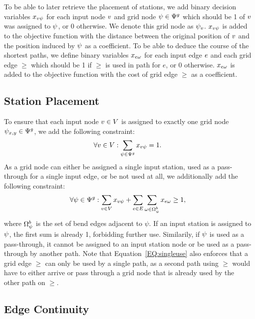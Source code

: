 \documentclass{sig-alternate-sigmod09}
\begin{document}
To be able to later retrieve the placement of stations, we add binary decision variables $x_{v\psi}$ for each input node $v$ and grid node $\psi \in \Psi^g$ which should be 1 of $v$ was assigned to $\psi$, or 0 otherwise.
We denote this grid node as $\psi_v$.
$x_{v\psi}$ is added to the objective function with the distance between the original position of $v$ and the position induced by $\psi$ as a coefficient.
To be able to deduce the course of the shortest paths, we define binary variables $x_{e\omega}$ for each input edge $e$ and each grid edge $\ge$ which should be 1 if $\ge$ is used in path for $e$, or 0 otherwise.
$x_{e\omega}$ is added to the objective function with the cost of grid edge $\ge$ as a coefficient.

\subsection{Station Placement}

To ensure that each input node $v \in V$ is assigned to exactly one grid node $\psi_{x, y} \in \Psi^g$, we add the following constraint:
%
\begin{equation}
  \forall v \in V: \sum_{\psi \in \Psi^g} x_{v\psi} = 1. \label{EQ:onegvperiv}
\end{equation}
%
As a grid node can either be assigned a single input station, used as a pass-through for a single input edge, or be not used at all, we additionally add the following constraint:
%
\begin{equation}
  \forall \psi \in \Psi^g: \sum_{v \in V} x_{v\psi} + \sum_{e \in E} \sum_{\omega \in \Omega^b_\psi} x_{e\omega} \geq 1, \label{EQ:singleuse}
\end{equation}
%
where $\Omega^b_\psi$ is the set of bend edges adjacent to $\psi$. 
If an input station is assigned to $\psi$, the first sum is already 1, forbidding further use.
Similarily, if $\psi$ is used as a pass-through, it cannot be assigned to an input station node or be used as a pass-through by another path.
Note that Equation~\ref{EQ:singleuse} also enforces that a grid edge $\ge$ can only be used by a single path, as a second path using $\ge$ would have to either arrive or pass through a grid node that is already used by the other path on $\ge$.

\subsection{Edge Continuity}
\end{document}
